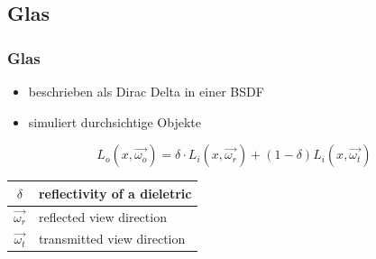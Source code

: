 \documentclass[11pt]{beamer}
\begin{document}
\subsection{Glas}
\begin{frame}[allowframebreaks]
\frametitle{Glas}
\begin{itemize}
\item beschrieben als Dirac Delta in einer BSDF
\item simuliert durchsichtige Objekte
\end{itemize}

\begin{equation}
L_o(x,\vec{\omega_o})= \delta \cdot L_i(x,\vec{\omega_r}) + (1-\delta) L_i(x,\vec{\omega_t})
\end{equation}

\begin{table}[H]
\begin{tabular}{| c | l |}
\hline
$\delta$ & reflectivity of a dieletric\\ \hline
$\vec{\omega_r}$ & reflected view direction\\ \hline
$\vec{\omega_t}$ & transmitted view direction\\ \hline
\end{tabular}
\end{table}

\framebreak
\begin{center}
\end{center}

\end{frame}
\end{document}
